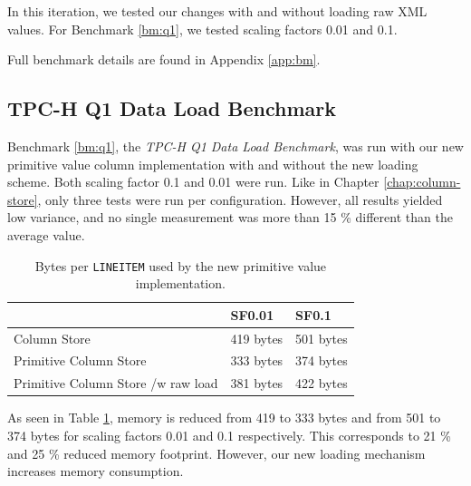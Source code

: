 In this iteration, we tested our changes with and without loading raw XML values. For Benchmark \ref{bm:q1}, we tested scaling factors 0.01 and 0.1.

Full benchmark details are found in Appendix \ref{app:bm}.


\subsection{TPC-H Q1 Data Load Benchmark}
\label{sub:storage-format-tpch-results}
Benchmark \ref{bm:q1}, the \textit{TPC-H Q1 Data Load Benchmark}, was run with our new primitive value column implementation with and without the new loading scheme. Both scaling factor 0.1 and 0.01 were run. Like in Chapter \ref{chap:column-store}, only three tests were run per configuration. However, all results yielded low variance, and no single measurement was more than 15 \% different than the average value.

\begin{table}
    \centering
    \begin{tabularx}{\textwidth}{X | X X}
        & SF0.01 & SF0.1 \\ 
        \hline
        \hline
        Column Store & 419 bytes & 501 bytes \\
        Primitive Column Store & 333 bytes & 374 bytes \\
        Primitive Column Store /w raw load & 381 bytes & 422 bytes \\
    \end{tabularx}
    \caption{Bytes per \texttt{LINEITEM} used by the new primitive value implementation.} 
    \label{tab:primitive-bpl}
\end{table}
As seen in Table \ref{tab:primitive-bpl}, memory is reduced from 419 to 333 bytes and from 501 to 374 bytes for scaling factors 0.01 and 0.1 respectively. This corresponds to 21 \% and 25 \% reduced memory footprint. However, our new loading mechanism increases memory consumption.

